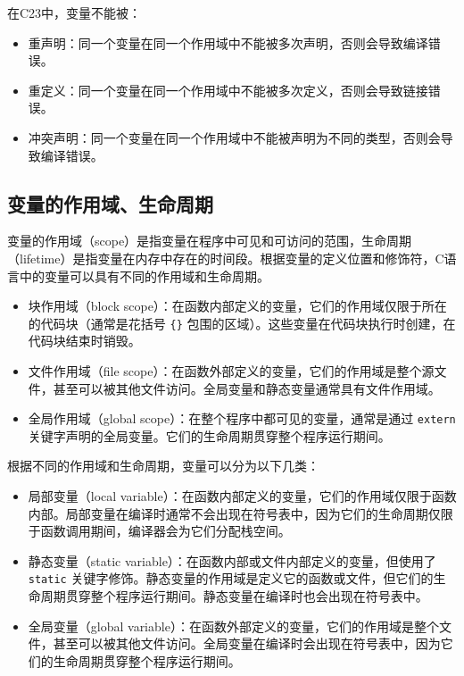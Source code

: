 在C23中，变量不能被：
\begin{itemize}
    \item 重声明：同一个变量在同一个作用域中不能被多次声明，否则会导致编译错误。
    \item 重定义：同一个变量在同一个作用域中不能被多次定义，否则会导致链接错误。
    \item 冲突声明：同一个变量在同一个作用域中不能被声明为不同的类型，否则会导致编译错误。
\end{itemize}

\subsection{变量的作用域、生命周期}

变量的作用域（scope）是指变量在程序中可见和可访问的范围，生命周期（lifetime）是指变量在内存中存在的时间段。根据变量的定义位置和修饰符，C语言中的变量可以具有不同的作用域和生命周期。
\begin{itemize}
    \item 块作用域（block scope）：在函数内部定义的变量，它们的作用域仅限于所在的代码块（通常是花括号 \verb|{}| 包围的区域）。这些变量在代码块执行时创建，在代码块结束时销毁。
    \item 文件作用域（file scope）：在函数外部定义的变量，它们的作用域是整个源文件，甚至可以被其他文件访问。全局变量和静态变量通常具有文件作用域。
    \item 全局作用域（global scope）：在整个程序中都可见的变量，通常是通过 \verb|extern| 关键字声明的全局变量。它们的生命周期贯穿整个程序运行期间。
\end{itemize}

根据不同的作用域和生命周期，变量可以分为以下几类：
\begin{itemize}
    \item 局部变量（local variable）：在函数内部定义的变量，它们的作用域仅限于函数内部。局部变量在编译时通常不会出现在符号表中，因为它们的生命周期仅限于函数调用期间，编译器会为它们分配栈空间。
    \item 静态变量（static variable）：在函数内部或文件内部定义的变量，但使用了 \verb|static| 关键字修饰。静态变量的作用域是定义它的函数或文件，但它们的生命周期贯穿整个程序运行期间。静态变量在编译时也会出现在符号表中。
    \item 全局变量（global variable）：在函数外部定义的变量，它们的作用域是整个文件，甚至可以被其他文件访问。全局变量在编译时会出现在符号表中，因为它们的生命周期贯穿整个程序运行期间。
\end{itemize}


